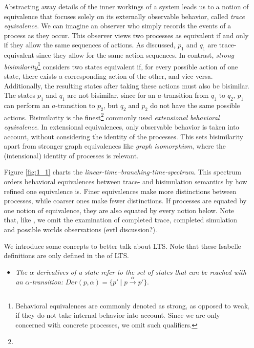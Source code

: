 \begin{isabellebody}
\begin{isamarkuptext}
Abstracting away details of the inner workings of a system leads us to a notion of equivalence that focuses solely on its externally observable behavior, called \textit{trace equivalence}. 
We can imagine an observer who simply records the events of a process as they occur. This observer views two processes as equivalent if and only if they allow the same sequences of actions. 
As discussed, $p_1$ and $q_1$ are trace-equivalent since they allow for the same action sequences. In contrast, \textit{strong bisimilarity}\footnote{Behavioral equivalences are commonly denoted as strong, as opposed to weak, if they do not take internal behavior into account. Since we are only concerned with concrete processes, we omit such qualifiers.} 
considers two states equivalent if, for every possible action of one state, there exists a corresponding action of the other, and vice versa. 
Additionally, the resulting states after taking these actions must also be bisimilar. The states $p_1$ and $q_1$ are not bisimilar, since for an $a$-transition from $q_1$ to $q_2$, $p_1$ can perform an $a$-transition to $p_2$, but $q_2$ and $p_2$ do not have the same possible actions.
Bisimilarity is the finest\footnote{} commonly used \textit{extensional behavioral equivalence}. In extensional equivalences, only observable behavior is taken into account, without considering the identity of the processes. 
This sets bisimilarity apart from stronger graph equivalences like \textit{graph isomorphism}, where the (intensional) identity of processes is relevant.%
\end{isamarkuptext}\isamarkuptrue%
%
\begin{isamarkuptext}%
Figure \ref{fig:1_1} charts the \textit{linear-time--branching-time-spectrum}. This spectrum orders behavioral equivalences between trace- and bisimulation semantics by how refined one equivalence is. Finer equivalences make more distinctions between
processes, while coarser ones make fewer distinctions. If processes are equated by one notion of equivalence, they are also equated by every notion below. Note that, like \cite{bisping2023process}, we omit the examination of completed trace, completed simulation and possible worlds observations (evtl discussion?).%
\end{isamarkuptext}\isamarkuptrue%
%
\begin{isamarkuptext}%
We introduce some concepts to better talk about LTS. Note that these Isabelle definitions are only defined in the  of LTS.%
\end{isamarkuptext}\isamarkuptrue%
%
\isadelimdocument
%
\endisadelimdocument
%
\isatagdocument
%
\isamarkuptrue%
%
\endisatagdocument
{\isafolddocument}%
%
\isadelimdocument
%
\endisadelimdocument
%
\begin{isamarkuptext}%
\begin{itemize}
    \item \textit{The \textnormal{$\alpha$-derivatives} of a state refer to the set of states that can be reached with an $\alpha$-transition:
    $\mathit{Der} (p, \alpha) = \{ p' \mid p \xrightarrow{\alpha} p' \}.$}


\end{itemize}
\end{isamarkuptext}
\end{isabellebody}

